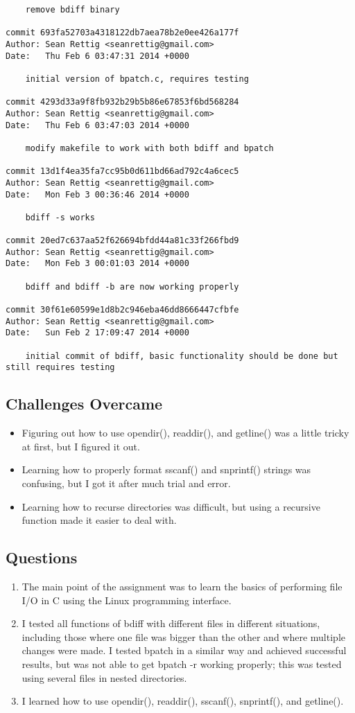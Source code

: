\documentclass[letterpaper,10pt,fleqn]{article}
\numberwithin{equation}{section}
\begin{document}
\begin{verbatim}
    remove bdiff binary

commit 693fa52703a4318122db7aea78b2e0ee426a177f
Author: Sean Rettig <seanrettig@gmail.com>
Date:   Thu Feb 6 03:47:31 2014 +0000

    initial version of bpatch.c, requires testing

commit 4293d33a9f8fb932b29b5b86e67853f6bd568284
Author: Sean Rettig <seanrettig@gmail.com>
Date:   Thu Feb 6 03:47:03 2014 +0000

    modify makefile to work with both bdiff and bpatch

commit 13d1f4ea35fa7cc95b0d611bd66ad792c4a6cec5
Author: Sean Rettig <seanrettig@gmail.com>
Date:   Mon Feb 3 00:36:46 2014 +0000

    bdiff -s works

commit 20ed7c637aa52f626694bfdd44a81c33f266fbd9
Author: Sean Rettig <seanrettig@gmail.com>
Date:   Mon Feb 3 00:01:03 2014 +0000

    bdiff and bdiff -b are now working properly

commit 30f61e60599e1d8b2c946eba46dd8666447cfbfe
Author: Sean Rettig <seanrettig@gmail.com>
Date:   Sun Feb 2 17:09:47 2014 +0000

    initial commit of bdiff, basic functionality should be done but still requires testing
\end{verbatim}

\subsection*{Challenges Overcame}
\begin{itemize}
    \item Figuring out how to use opendir(), readdir(), and getline() was a little tricky at first, but I figured it out.
    \item Learning how to properly format sscanf() and snprintf() strings was confusing, but I got it after much trial and error.
    \item Learning how to recurse directories was difficult, but using a recursive function made it easier to deal with.
\end{itemize}

\subsection*{Questions}
\begin{enumerate}
    \item The main point of the assignment was to learn the basics of performing file I/O in C using the Linux programming interface.
    \item I tested all functions of bdiff with different files in different situations, including those where one file was bigger than the other and where multiple changes were made.  I tested bpatch in a similar way and achieved successful results, but was not able to get bpatch -r working properly; this was tested using several files in nested directories.
    \item I learned how to use opendir(), readdir(), sscanf(), snprintf(), and getline().
\end{enumerate}
\end{document}
